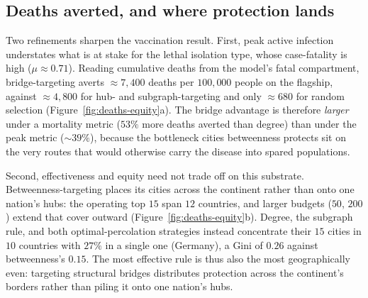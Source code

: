\subsection{Deaths averted, and where protection lands}\label{sec:res-deaths}
Two refinements sharpen the vaccination result. First, peak active infection understates what is at
stake for the lethal isolation type, whose case-fatality is high ($\mu\approx0.71$). Reading
cumulative deaths from the model's fatal compartment, bridge-targeting averts $\approx$$7{,}400$
deaths per $100{,}000$ people on the flagship, against $\approx$$4{,}800$ for hub- and
subgraph-targeting and only $\approx$$680$ for random selection (Figure~\ref{fig:deaths-equity}a). The
bridge advantage is therefore \emph{larger} under a mortality metric ($53\%$ more deaths averted
than degree) than under the peak metric ($\sim$$39\%$), because the bottleneck cities betweenness
protects sit on the very routes that would otherwise carry the disease into spared populations.

Second, effectiveness and equity need not trade off on this substrate. Betweenness-targeting places
its cities across the continent rather than onto one nation's hubs: the operating top $15$ span
$12$ countries, and larger budgets ($50$, $200$) extend that cover outward
(Figure~\ref{fig:deaths-equity}b). Degree, the subgraph rule, and both optimal-percolation strategies
instead concentrate their $15$ cities in $10$ countries with $27\%$ in a single one (Germany), a
Gini of $0.26$ against betweenness's $0.15$. The most effective rule is thus also the most
geographically even: targeting structural bridges distributes protection across the continent's
borders rather than piling it onto one nation's hubs.

